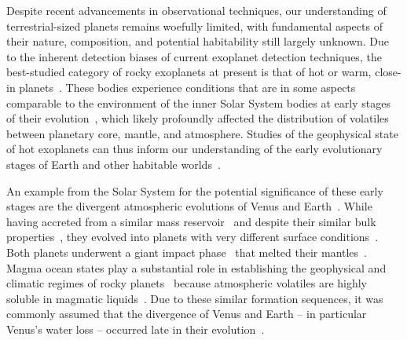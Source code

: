 \documentclass[twocolumn,twocolappendix]{aastex631}
\begin{document}
Despite recent advancements in observational techniques, our understanding of terrestrial-sized planets remains woefully limited, with fundamental aspects of their nature, composition, and potential habitability still largely unknown.
Due to the inherent detection biases of current exoplanet detection techniques, the best-studied category of rocky exoplanets at present is that of hot or warm, close-in planets~\citep{2019AREPS..47..141J,2021JGRE..12606639B}.
These bodies experience conditions that are in some aspects comparable to the environment of the inner Solar System bodies at early stages of their evolution~\citep{Ikoma2018,2021ChEG...81l5735C}, which likely profoundly affected the distribution of volatiles between planetary core, mantle, and atmosphere.
Studies of the geophysical state of hot exoplanets can thus inform our understanding of the early evolutionary stages of Earth and other habitable worlds~\citep{Lichtenberg2022,Krijt2022}.


An example from the Solar System for the potential significance of these early stages are the divergent atmospheric evolutions of Venus and Earth~\citep[e.g.,][]{2019JGRE..124.2015K,2021JGRE..12606643K}.
While having accreted from a similar mass reservoir~\citep{2020plas.book..287R,2020SSRv..216...55K,2020SSRv..216...27M,2020plas.book....3Z} and despite their similar bulk properties~\citep{Smrekar2018}, they evolved into planets with very different surface conditions~\citep{1982Sci...216..630D,Kasting1988,Hamano2013,Kane2014,Way2020,Turbet2021}.
Both planets underwent a giant impact phase~\citep{2020plas.book..287R,2020NatGe..13..265G,Liu2022} that melted their mantles~\citep{2012AREPS..40..113E,2018RSPTA.37680109S,Lichtenberg2022}.
Magma ocean states play a substantial role in establishing the geophysical and climatic regimes of rocky planets~\citep{2020ChEG...80l5594F} because atmospheric volatiles are highly soluble in magmatic liquids~\citep{2021ApJ...909L..22K,Dorn2021}.
Due to these similar formation sequences, it was commonly assumed that the divergence of Venus and Earth -- in particular Venus's water loss -- occurred late in their evolution~\citep{Way2020}.
\end{document}
